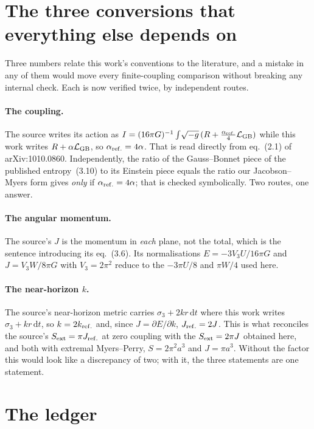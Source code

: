 \documentclass[11pt,a4paper]{article}
\begin{document}
\section*{The three conversions that everything else depends on}

Three numbers relate this work's conventions to the literature, and a mistake in
any of them would move every finite-coupling comparison without breaking any
internal check. Each is now verified twice, by independent routes.

\paragraph{The coupling.} The source writes its action as
$I=(16\pi G)^{-1}\int\!\sqrt{-g}\,(R+\tfrac{\alpha_{\rm ref.}}{4}\mathcal L_{\rm GB})$
while this work writes $R+\alpha\mathcal L_{\rm GB}$, so
$\alpha_{\rm ref.}=4\alpha$. That is read directly from eq.~(2.1) of
arXiv:1010.0860. Independently, the ratio of the Gauss--Bonnet piece of the
published entropy~(3.10) to its Einstein piece equals the ratio our
Jacobson--Myers form gives \emph{only} if $\alpha_{\rm ref.}=4\alpha$; that
is checked symbolically. Two routes, one answer.

\paragraph{The angular momentum.} The source's $J$ is the momentum in
\emph{each} plane, not the total, which is the sentence introducing its
eq.~(3.6). Its normalisations $E=-3V_3U/16\pi G$ and $J=V_3W/8\pi G$ with
$V_3=2\pi^2$ reduce to the $-3\pi U/8$ and $\pi W/4$ used here.

\paragraph{The near-horizon $k$.} The source's near-horizon metric carries
$\sigma_3+2kr\,\mathrm{d}t$ where this work writes $\sigma_3+kr\,\mathrm{d}t$,
so $k=2k_{\rm ref.}$ and, since $J=\partial E/\partial k$,
$J_{\rm ref.}=2J$. This is what reconciles the source's
$S_{\rm ext}=\pi J_{\rm ref.}$ at zero coupling with the
$S_{\rm ext}=2\pi J$ obtained here, and both with extremal Myers--Perry,
$S=2\pi^2a^3$ and $J=\pi a^3$. Without the factor this would look like a
discrepancy of two; with it, the three statements are one statement.

\section*{The ledger}
\end{document}
